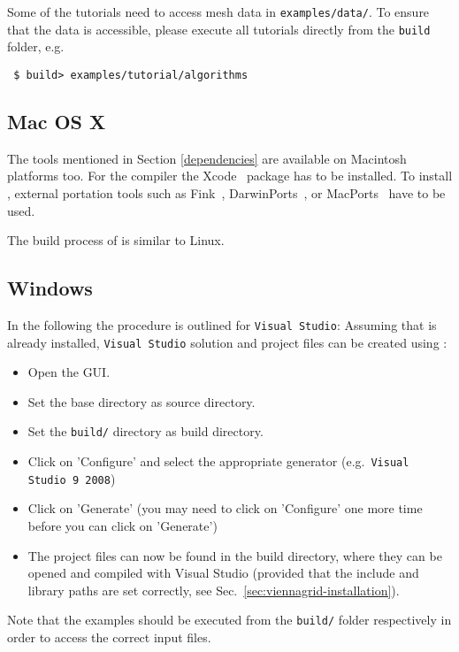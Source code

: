 Some of the tutorials need to access mesh data in \texttt{examples/data/}.
To ensure that the data is accessible, please execute all tutorials directly from the \texttt{build} folder, e.g.

\begin{lstlisting}
 $ build> examples/tutorial/algorithms
\end{lstlisting}

\subsection{Mac OS X}
\label{apple}
The tools mentioned in Section \ref{dependencies} are available on
Macintosh platforms too.
For the {\GCC} compiler the Xcode~\cite{xcode} package has to be installed.
To install {\CMake}, external portation tools such as
Fink~\cite{fink}, DarwinPorts~\cite{darwinports},
or MacPorts~\cite{macports} have to be used.

The build process of {\ViennaGrid} is similar to Linux.

\subsection{Windows}
In the following the procedure is outlined for \texttt{Visual Studio}: Assuming
that {\CMake} is already installed, \texttt{Visual Studio} solution
and project files can be created using {\CMake}:
\begin{itemize}
\item Open the {\CMake} GUI.
\item Set the {\ViennaGrid} base directory as source directory.
\item Set the \texttt{build/} directory as build directory.
\item Click on 'Configure' and select the appropriate generator
(e.g.~\texttt{Visual Studio 9 2008})
\item Click on 'Generate' (you may need to click on 'Configure' one more time
before you can click on 'Generate')
\item The project files can now be found in the {\ViennaGrid} build directory,
where they can be opened and compiled with Visual Studio (provided that the
include and library paths are set correctly, see
Sec.~\ref{sec:viennagrid-installation}).
\end{itemize}

Note that the examples should be executed from the \texttt{build/} folder respectively in order to access the correct input files.
